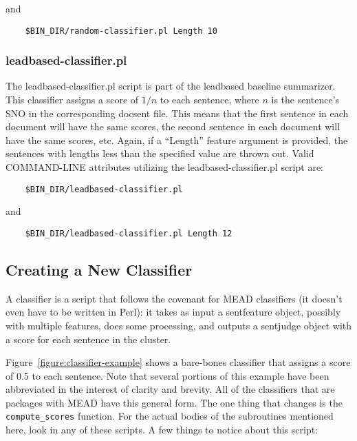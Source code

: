 \documentclass[10pt]{article}
\begin{document}
\noindent
and

\begin{verbatim}
    $BIN_DIR/random-classifier.pl Length 10
\end{verbatim}

\subsubsection{leadbased-classifier.pl}

The leadbased-classifier.pl script is part of the
leadbased baseline summarizer.
This classifier assigns a score of $1/n$ to each
sentence, where $n$ is the sentence's SNO in the 
corresponding docsent file.  This means that the
first sentence in each document will have the same 
scores, the second sentence in each document will
have the same scores, etc.  Again, if a ``Length''
feature argument is provided, the sentences with
lengths less than the specified value are thrown
out.  Valid COMMAND-LINE attributes utilizing 
the leadbased-classifier.pl script are:

\begin{verbatim}
    $BIN_DIR/leadbased-classifier.pl
\end{verbatim}

\noindent
and

\begin{verbatim}
    $BIN_DIR/leadbased-classifier.pl Length 12
\end{verbatim}

\subsection{Creating a New Classifier}

A classifier is a script that follows the covenant for 
MEAD classifiers (it doesn't even have to be written
in Perl):  it takes as input a sentfeature object,
possibly with multiple features, does some processing,
and outputs a sentjudge object with a score for each
sentence in the cluster.  

Figure~\ref{figure:classifier-example} shows a bare-bones
classifier that assigns a score of 0.5 to each sentence.
Note that several portions of this example have been abbreviated
in the interest of clarity and brevity.
All of the classifiers that are packages with MEAD have 
this general form.  The one thing that changes is the 
\verb|compute_scores| function.  For the actual bodies of the
subroutines mentioned here, look in any of these scripts.
A few things to notice about this script:
\end{document}
